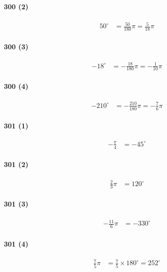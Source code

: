 \documentclass[fleqn,a4j,dvipdfmx,uplatex,twocolumn]{jsarticle}
\begin{document}
\paragraph{300 (2)}
\begin{align*}
  50^{\circ} &= \frac{50}{180}\pi = \frac{5}{18}\pi
\end{align*}

\paragraph{300 (3)}
\begin{align*}
  -18^{\circ} &= -\frac{18}{180}\pi = -\frac{1}{10}\pi
\end{align*}

\paragraph{300 (4)}
\begin{align*}
  -210^{\circ} &= -\frac{210}{180}\pi = -\frac{7}{6}\pi
\end{align*}

\paragraph{301 (1)}
\begin{align*}
  -\frac{\pi}{4} &= -45^{\circ}
\end{align*}

\paragraph{301 (2)}
\begin{align*}
  \frac{2}{3}\pi &= 120^{\circ}
\end{align*}

\paragraph{301 (3)}
\begin{align*}
  -\frac{11}{6}\pi &= -330^{\circ}
\end{align*}

\paragraph{301 (4)}
\begin{align*}
  \frac{7}{5}\pi &= \frac{7}{5} \times 180^{\circ} = 252^{\circ}
\end{align*}
\end{document}
